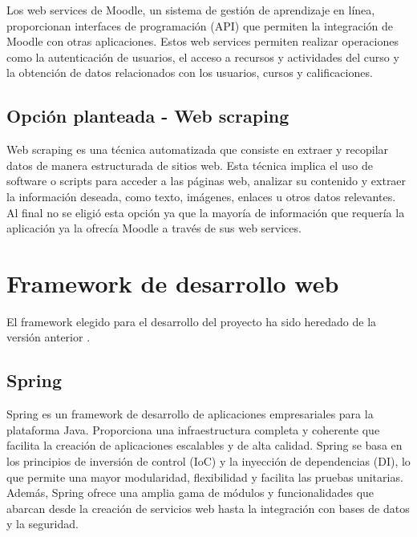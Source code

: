 Los web services de Moodle, un sistema de gestión de aprendizaje en línea, proporcionan interfaces de programación (API) que permiten la integración de Moodle con otras aplicaciones. Estos web services permiten realizar operaciones como la autenticación de usuarios, el acceso a recursos y actividades del curso y la obtención de datos relacionados con los usuarios, cursos y calificaciones.
\subsection{Opción planteada - Web scraping}
Web scraping es una técnica automatizada que consiste en extraer y recopilar datos de manera estructurada de sitios web. Esta técnica implica el uso de software o scripts para acceder a las páginas web, analizar su contenido y extraer la información deseada, como texto, imágenes, enlaces u otros datos relevantes.
Al final no se eligió esta opción ya que la mayoría de información que requería la aplicación ya la ofrecía Moodle a través de sus web services.

\section{Framework de desarrollo web}
El framework elegido para el desarrollo del proyecto ha sido heredado de la versión anterior \cite{previotfg}.
\subsection{Spring}
Spring es un framework de desarrollo de aplicaciones empresariales para la plataforma Java. Proporciona una infraestructura completa y coherente que facilita la creación de aplicaciones escalables y de alta calidad. Spring se basa en los principios de inversión de control (IoC) y la inyección de dependencias (DI), lo que permite una mayor modularidad, flexibilidad y facilita las pruebas unitarias. Además, Spring ofrece una amplia gama de módulos y funcionalidades que abarcan desde la creación de servicios web hasta la integración con bases de datos y la seguridad.